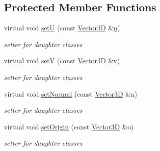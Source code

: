 \subsection*{Protected Member Functions}
\begin{DoxyCompactItemize}
\item 
virtual void \hyperlink{class_d_d4hep_1_1_d_d_rec_1_1_vol_surface_base_a8a39b98345cf8bb2ea7912b3974552e9}{setU} (const \hyperlink{class_d_d_surfaces_1_1_vector3_d}{Vector3D} \&\hyperlink{class_d_d4hep_1_1_d_d_rec_1_1_vol_surface_base_a4eb22902d5caf992589142a93accc48d}{u})
\begin{DoxyCompactList}\small\item\em setter for daughter classes \end{DoxyCompactList}\item 
virtual void \hyperlink{class_d_d4hep_1_1_d_d_rec_1_1_vol_surface_base_a032025d40e5fee926713517ae36f5d4b}{setV} (const \hyperlink{class_d_d_surfaces_1_1_vector3_d}{Vector3D} \&\hyperlink{class_d_d4hep_1_1_d_d_rec_1_1_vol_surface_base_a94d4f190a803d08a9739fb31a8c6fd2f}{v})
\begin{DoxyCompactList}\small\item\em setter for daughter classes \end{DoxyCompactList}\item 
virtual void \hyperlink{class_d_d4hep_1_1_d_d_rec_1_1_vol_surface_base_a1ccc4ac2bd7ff9293b01798844d243e1}{set\+Normal} (const \hyperlink{class_d_d_surfaces_1_1_vector3_d}{Vector3D} \&n)
\begin{DoxyCompactList}\small\item\em setter for daughter classes \end{DoxyCompactList}\item 
virtual void \hyperlink{class_d_d4hep_1_1_d_d_rec_1_1_vol_surface_base_a3dc33b9f3661403fbeeaeb787e71d247}{set\+Origin} (const \hyperlink{class_d_d_surfaces_1_1_vector3_d}{Vector3D} \&o)
\begin{DoxyCompactList}\small\item\em setter for daughter classes \end{DoxyCompactList}\end{DoxyCompactItemize}
